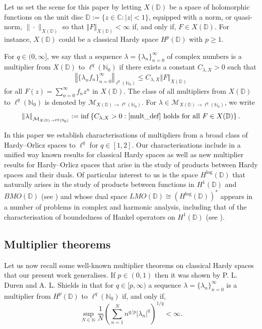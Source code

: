 \documentclass[a4paper, leqno, 10pt]{amsart}
\numberwithin{equation}{section}
\newcommand{\norm}[1]{\left\Vert#1\right\Vert}
\newcommand{\D}{\mathbb{D}}
\newcommand{\C}{\mathbb{C}}
\newcommand{\N}{\mathbb{N}}
\begin{document}
Let us set the scene for this paper by letting $X(\D)$ be a space of holomorphic functions on the unit disc $\D := \{ z \in \C: |z| < 1 \}$, equipped with a norm, or quasi-norm, $\| \cdot \|_{X(\D)}$ so that $\norm{F}_{X(\D)} <\infty$ if, and only if, $F \in X(\D)$. For instance, $X(\D)$ could be a classical Hardy space $H^p (\D)$ with $p\geq 1$.

For $q \in (0, \infty]$, we say that a sequence $\lambda= \{ \lambda_n \}_{n=0}^{\infty}$ of complex numbers is a multiplier from $X(\D)$ to $\ell^q (\N_0)$ if there exists a constant $C_{\lambda, X} > 0$ such that
\begin{equation}\label{mult_def}
\norm{\{ \lambda_n f_n \}_{n=0}^{\infty}}_{\ell^q (\N_0)} \leq C_{\lambda, X} \norm{ F }_{X(\D)}  
\end{equation}
for all $F(z)= \sum_{n = 0}^{\infty} f_n z^n $ in $X(\D)$. The class of all multipliers from $X(\D)$ to $\ell^q (\N_0)$ is denoted by $\mathcal{M}_{X(\D) \rightarrow \ell^q (\N_0)}$. 
For $\lambda \in \mathcal{M}_{X(\D) \rightarrow \ell^q (\N_0)}$, we write
\[
\norm{\lambda}_{ \mathcal{M}_{X(\D) \rightarrow \ell^q (\N_0)}} := \inf \left\{ C_{\lambda, X} >0 : \eqref{mult_def} \text{ holds for all } F \in X(\D) \right\}.   
\]

In this paper we establish characterisations of multipliers from a broad class of Hardy--Orlicz spaces to $\ell^q$ for $q \in [1,2]$. Our characterisations include in a unified way known results for classical Hardy spaces as well as new multiplier results for Hardy--Orlicz spaces that arise in the study of products between Hardy spaces and their duals. %
Of particular interest to us is the space $H^{\log} (\D)$ that naturally arises in the study of products between functions in $H^1 (\D)$ and $BMO (\D)$ (see \cite{BIJZ}) and whose dual space $LMO (\D) \cong ( H^{\log} (\D) )^{\ast}$ appears in a number of problems in complex and harmonic analysis, including that of the characterisation of boundedness of Hankel operators on $H^1 (\D)$ (see \cite{JPS}). 

%
\subsection*{Multiplier theorems} Let us now recall some well-known multiplier theorems on classical Hardy spaces that our present work generalises.
If $p \in (0,1)$ then it was shown by P. L. Duren and A. L. Shields in \cites{DS_69,DS_70} that for $q \in [p, \infty)$ a sequence $\lambda = \{ \lambda_n \}_{n=0}^{\infty}$ is a multiplier from $H^p(\D)$ to $\ell^q (\N_0)$ if, and only if,  
\begin{equation}\label{Hp_lq}
\sup_{N \in \N} \frac{1}{N} \left( \sum_{n=1}^N n^{q/p} |\lambda_n|^q \right)^{1/q} < \infty.   
\end{equation}
\end{document}
